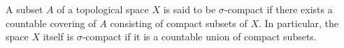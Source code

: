 A subset $A$ of a topological space $X$ is said to be $\sigma$-compact if there exists a countable covering of $A$ consisting of compact subsets of $X$. In particular, the space $X$ itself is $\sigma$-compact if it is a countable union of compact subsets.
